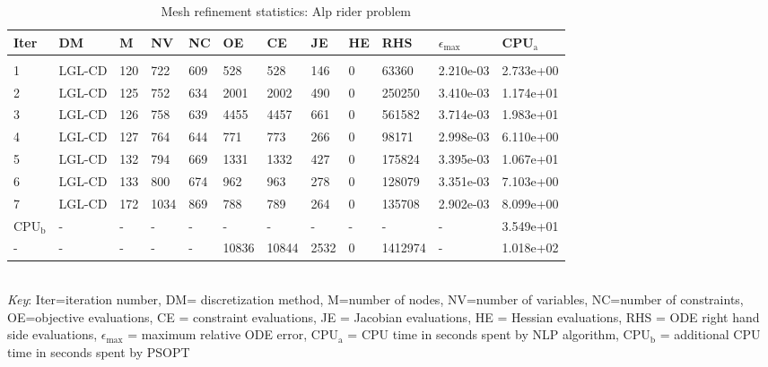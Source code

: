 
\begin{table}
\caption{Mesh refinement statistics: Alp rider problem}
\label{mesh_stats_alpine}
\renewcommand{\tabcolsep}{0.15cm}
\tiny
\begin{tabular}{llllllllllll}
Iter&DM&M&NV&NC&OE&CE&JE&HE&RHS&$\epsilon_{\max}$&CPU$_\mathrm{a}$ \\ \hline \\
1&LGL-CD&120&722&609&528&528&146&0&63360&2.210e-03&2.733e+00\\
2&LGL-CD&125&752&634&2001&2002&490&0&250250&3.410e-03&1.174e+01\\
3&LGL-CD&126&758&639&4455&4457&661&0&561582&3.714e-03&1.983e+01\\
4&LGL-CD&127&764&644&771&773&266&0&98171&2.998e-03&6.110e+00\\
5&LGL-CD&132&794&669&1331&1332&427&0&175824&3.395e-03&1.067e+01\\
6&LGL-CD&133&800&674&962&963&278&0&128079&3.351e-03&7.103e+00\\
7&LGL-CD&172&1034&869&788&789&264&0&135708&2.902e-03&8.099e+00\\
\hline
CPU$_\mathrm{b}$ &-&-&-&-&-&-&-&-&-&-&3.549e+01\\
-&-&-&-&-&10836&10844&2532&0&1412974&-&1.018e+02\\
\end{tabular}
\newline \\ \emph{Key}: Iter=iteration number, DM= discretization method, M=number of nodes, NV=number of variables, NC=number of constraints, OE=objective evaluations,  	              CE = constraint evaluations, JE = Jacobian evaluations, HE = Hessian evaluations, RHS = ODE right hand side 		      evaluations, $\epsilon_{\max}$ = maximum relative ODE error, CPU$_\mathrm{a}$ = CPU time in seconds spent by NLP algorithm, 		      CPU$_\mathrm{b}$ = additional CPU time in seconds spent by PSOPT
\normalsize
\end{table}
